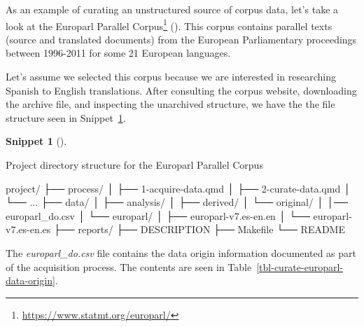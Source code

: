 \documentclass[
  letterpaper,
  krantz1]{latex/krantz-mod}
\newenvironment{Shaded}{\begin{snugshade}}{\end{snugshade}}
\newcommand{\ExtensionTok}[1]{\textcolor[rgb]{0.00,0.00,0.00}{#1}}
\newcommand{\NormalTok}[1]{\textcolor[rgb]{0.00,0.00,0.00}{#1}}
\theoremstyle{definition}
\theoremstyle{definition}
\newtheorem{definition}{Snippet}[chapter]
\theoremstyle{remark}
\DeclareRobustCommand{\href}[2]{#2\footnote{\url{#1}}}
\begin{document}
As an example of curating an unstructured source of corpus data, let's
take a look at the \href{https://www.statmt.org/europarl/}{Europarl
Parallel Corpus} (). This corpus
contains parallel texts (source and translated documents) from the
European Parliamentary proceedings between 1996-2011 for some 21
European languages.

Let's assume we selected this corpus because we are interested in
researching Spanish to English translations. After consulting the corpus
website, downloading the archive file, and inspecting the unarchived
structure, we have the the file structure seen in
Snippet~\ref{def-curate-europarl-file-structure}.

\begin{definition}[]\protect\hypertarget{def-curate-europarl-file-structure}{}\label{def-curate-europarl-file-structure}

Project directory structure for the Europarl Parallel Corpus

\begin{Shaded}
\begin{Highlighting}[]
\ExtensionTok{project/}
\ExtensionTok{├──}\NormalTok{ process/}
\ExtensionTok{│}\NormalTok{   ├── 1{-}acquire{-}data.qmd}
\ExtensionTok{│}\NormalTok{   ├── 2{-}curate{-}data.qmd}
\ExtensionTok{│}\NormalTok{   └── ...}
\ExtensionTok{├──}\NormalTok{ data/}
\ExtensionTok{│}\NormalTok{   ├── analysis/}
\ExtensionTok{│}\NormalTok{   ├── derived/}
\ExtensionTok{│}\NormalTok{   └── original/}
\ExtensionTok{│}\NormalTok{       │── europarl\_do.csv}
\ExtensionTok{│}\NormalTok{       └── europarl/}
\ExtensionTok{│}\NormalTok{           ├── europarl{-}v7.es{-}en.en}
\ExtensionTok{│}\NormalTok{           └── europarl{-}v7.es{-}en.es}
\ExtensionTok{├──}\NormalTok{ reports/}
\ExtensionTok{├──}\NormalTok{ DESCRIPTION}
\ExtensionTok{├──}\NormalTok{ Makefile}
\ExtensionTok{└──}\NormalTok{ README}
\end{Highlighting}
\end{Shaded}

\end{definition}

The \emph{europarl\_do.csv} file contains the data origin information
documented as part of the acquisition process. The contents are seen in
Table~\ref{tbl-curate-europarl-data-origin}.
\end{document}
